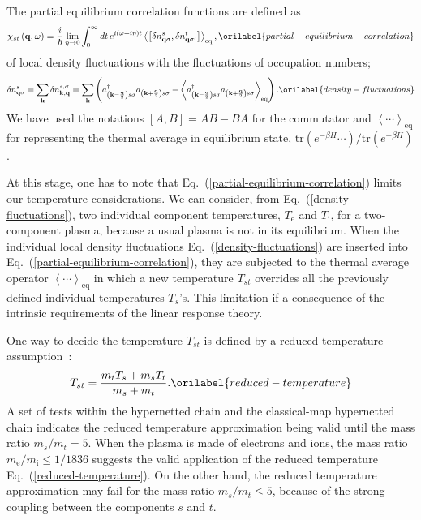 \documentclass[aps,showkeys,noshowpacs,superscriptaddress,pre,preprint]{revtex4-2}
\let\label\orilabel
\begin{document}
The partial equilibrium correlation functions are defined as
\begin{equation}
{\chi_{st} \left( \mathbf{q}, \omega \right)} = \frac{i}{\hbar} \lim_{\eta \rightarrow 0}
\int_0^\infty dt \, e^{i \left( \omega + i\eta \right) t} 
\left\langle \left[
{\delta n^s_{\mathbf{q} \sigma}} , {\delta n^t_{\mathbf{q} \sigma^\prime}}
\right] \right\rangle_\mathrm{eq} ,
\label{partial-equilibrium-correlation}
\end{equation}
of local density fluctuations with the fluctuations of occupation numbers;
\begin{equation}
{\delta n^s_{\mathbf{q} \sigma}}
= \sum_\mathbf{k} {\delta n^{s, \sigma}_{\mathbf{k}, \mathbf{q}}}
= \sum_\mathbf{k} \left( {a^\dag_{\left( \mathbf{k} - \frac{\mathbf{q}}{2} \right) s \sigma}} 
{a_{\left( \mathbf{k} + \frac{\mathbf{q}}{2} \right) s \sigma}}
- \left\langle {a^\dag_{\left( \mathbf{k} - \frac{\mathbf{q}}{2} \right) s \sigma}} 
{a_{\left( \mathbf{k} + \frac{\mathbf{q}}{2} \right) s \sigma}}
\right\rangle_\mathrm{eq} 
\right) .
\label{density-fluctuations}
\end{equation}
We have used the notations $\left[ A, B \right] = AB - BA$ for the commutator
and $\left\langle \cdots \right\rangle_\mathrm{eq}$ for representing
the thermal average in equilibrium state, $\mathrm{tr} \left( e^{-\beta H} \cdots \right) / \mathrm{tr} \left( e^{-\beta H} \right)$.

At this stage, one has to note that Eq.~(\ref{partial-equilibrium-correlation}) limits our temperature considerations.
We can consider, from Eq.~(\ref{density-fluctuations}),
two individual component temperatures, $T_\mathrm{e}$ and $T_\mathrm{i}$,
for a two-component plasma, because a usual plasma is not in its equilibrium.
When the individual local density fluctuations Eq.~(\ref{density-fluctuations}) are inserted into
Eq.~(\ref{partial-equilibrium-correlation}),
they are subjected to the thermal average operator $\left\langle \cdots \right\rangle_\mathrm{eq}$
in which a new temperature $T_{st}$ overrides all the previously defined individual temperatures $T_s$'s.
This limitation if a consequence of the intrinsic requirements of the linear response theory.

One way to decide the temperature $T_{st}$ is defined by 
a reduced temperature assumption~\cite{Dharma-wardana-Murillo2008}:
\begin{equation}
T_{st} = \frac{m_t T_s + m_s T_t}{m_s + m_t} .
\label{reduced-temperature}
\end{equation}
A set of tests within the hypernetted chain and the classical-map hypernetted chain 
indicates the reduced temperature approximation being valid
until the mass ratio $m_s / m_t = 5$.
When the plasma is made of electrons and ions, 
the mass ratio $m_\mathrm{e} / m_\mathrm{i} \le 1/1836$
suggests the valid application of the reduced temperature Eq.~(\ref{reduced-temperature}).
On the other hand, the reduced temperature approximation may fail
for the mass ratio $m_s / m_t \le 5$,
because of the strong coupling between the components $s$ and $t$.
\end{document}
